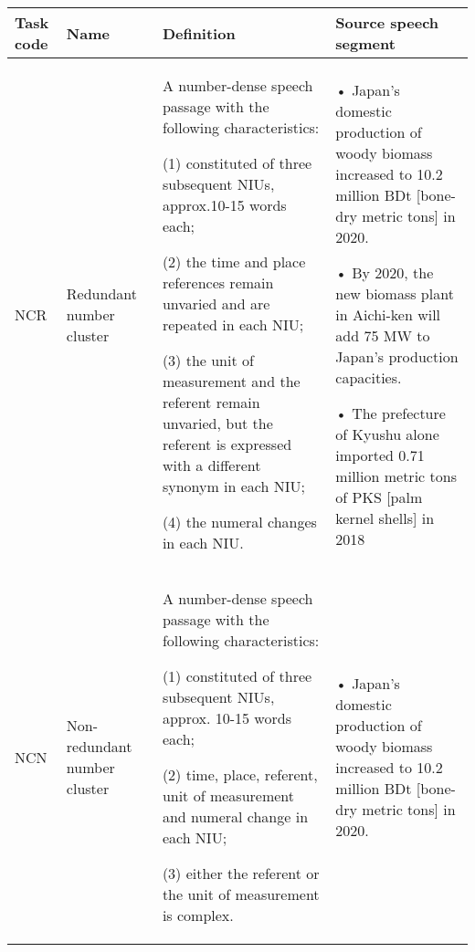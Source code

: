 \begin{sidewaystable}
\small
\begin{tabularx}{\textwidth}{l>{\raggedright\arraybackslash}p{}QQ}
\midrule
{Task code}   & {Name}   & {Definition}   & {Source speech segment}                                                                                                                                                                                                                                                                                                                                                                                                                                                                                                                          \\ \midrule
NCR                  & Redundant number cluster                                             & A number-dense speech passage with the following characteristics:  

(1) constituted of three subsequent NIUs, approx.10-15 words each; 

(2) the time and place references remain unvaried and are repeated in each   NIU;

(3) the unit of measurement and the referent remain unvaried, but the referent is expressed with a different synonym in each NIU;

(4) the numeral changes in each NIU. & •   Japan's domestic production of woody biomass increased to 10.2 million BDt {[}bone-dry metric tons{]} in 2020.

•   By 2020, the new biomass plant in Aichi-ken will add 75 MW to Japan's production capacities.

•  The prefecture of Kyushu alone imported 0.71 million metric tons of PKS {[}palm kernel shells{]} in 2018                                                                                                                                         \\ 
\tablevspace
NCN                  & Non-redundant number cluster   &                                     A number-dense speech passage with the following characteristics: 

(1) constituted of three subsequent NIUs, approx. 10-15 words each; 

(2) time, place, referent, unit of measurement and numeral change in each NIU; 

(3) either the referent or the unit of measurement is complex.                                                                                                    & •   Japan's domestic production of woody biomass increased to 10.2 million BDt {[}bone-dry metric tons{]} in 2020.


\end{tabularx}
\end{sidewaystable}
